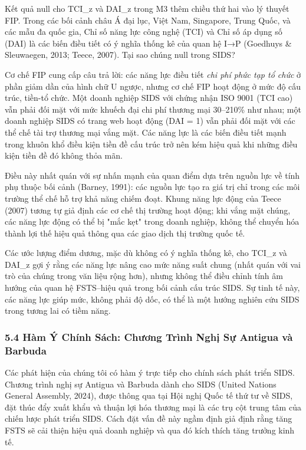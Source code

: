 \documentclass[12pt,a4paper]{article}
\begin{document}
Kết quả null cho TCI\_z và DAI\_z trong M3 thêm chiều thứ hai vào lý
thuyết FIP. Trong các bối cảnh châu Á đại lục, Việt Nam, Singapore,
Trung Quốc, và các mẫu đa quốc gia, Chỉ số năng lực công nghệ (TCI) và
Chỉ số áp dụng số (DAI) là các biến điều tiết có ý nghĩa thống kê của
quan hệ I→P (Goedhuys \& Sleuwaegen, 2013; Teece, 2007). Tại sao chúng
null trong SIDS?

Cơ chế FIP cung cấp câu trả lời: các năng lực điều tiết \emph{chi phí
phức tạp tổ chức} ở phần giảm dần của hình chữ U ngược, nhưng cơ chế FIP
hoạt động ở mức độ cấu trúc, tiền-tổ chức. Một doanh nghiệp SIDS với
chứng nhận ISO 9001 (TCI cao) vẫn phải đối mặt với mức khuếch đại chi
phí thương mại 30--210\% như nhau; một doanh nghiệp SIDS có trang web
hoạt động (DAI = 1) vẫn phải đối mặt với các thể chế tài trợ thương mại
vắng mặt. Các năng lực là các biến điều tiết mạnh trong khuôn khổ điều
kiện tiền đề cấu trúc trở nên kém hiệu quả khi những điều kiện tiền đề
đó không thỏa mãn.

Điều này nhất quán với sự nhấn mạnh của quan điểm dựa trên nguồn lực về
tính phụ thuộc bối cảnh (Barney, 1991): các nguồn lực tạo ra giá trị chỉ
trong các môi trường thể chế hỗ trợ khả năng chiếm đoạt. Khung năng lực
động của Teece (2007) tương tự giả định các cơ chế thị trường hoạt động;
khi vắng mặt chúng, các năng lực động có thể bị "mắc kẹt" trong doanh
nghiệp, không thể chuyển hóa thành lợi thế hiệu quả thông qua các giao
dịch thị trường quốc tế.

Các ước lượng điểm dương, mặc dù không có ý nghĩa thống kê, cho TCI\_z
và DAI\_z gợi ý rằng các năng lực nâng cao mức năng suất chung (nhất
quán với vai trò của chúng trong văn liệu rộng hơn), nhưng không thể
điều chỉnh tính âm hướng của quan hệ FSTS--hiệu quả trong bối cảnh cấu
trúc SIDS. Sự tinh tế này, các năng lực giúp mức, không phải độ dốc, có
thể là một hướng nghiên cứu SIDS trong tương lai có tiềm năng.

\hypertarget{54-huxe0m-uxfd-chuxednh-suxe1ch-chux1b0ux1a1ng-truxecnh-nghux1ecb-sux1ef1-antigua-vuxe0-barbuda}{%
\subsubsection{5.4 Hàm Ý Chính Sách: Chương Trình Nghị Sự Antigua và
Barbuda}\label{54-huxe0m-uxfd-chuxednh-suxe1ch-chux1b0ux1a1ng-truxecnh-nghux1ecb-sux1ef1-antigua-vuxe0-barbuda}}

Các phát hiện của chúng tôi có hàm ý trực tiếp cho chính sách phát triển
SIDS. Chương trình nghị sự Antigua và Barbuda dành cho SIDS (United
Nations General Assembly, 2024), được thông qua tại Hội nghị Quốc tế thứ
tư về SIDS, đặt thúc đẩy xuất khẩu và thuận lợi hóa thương mại là các
trụ cột trung tâm của chiến lược phát triển SIDS. Cách đặt vấn đề này
ngầm định giả định rằng tăng FSTS sẽ cải thiện hiệu quả doanh nghiệp và
qua đó kích thích tăng trưởng kinh tế.
\end{document}
